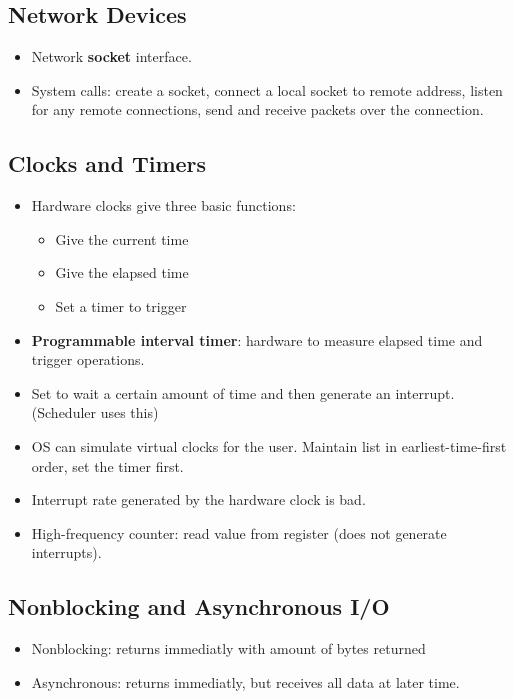 \documentclass[10pt]{report}
\begin{document}
		\subsection{Network Devices}
			\begin{itemize}
				\item Network \textbf{socket} interface.
				\item System calls: create a socket, connect a local socket to remote address, listen for any remote connections, send and receive packets over the connection.
			\end{itemize}

		\subsection{Clocks and Timers}
			\begin{itemize}
				\item Hardware clocks give three basic functions:
				\begin{itemize}
					\item Give the current time
					\item Give the elapsed time
					\item Set a timer to trigger
				\end{itemize}
				\item \textbf{Programmable interval timer}: hardware to measure elapsed time and trigger operations.
				\item Set to wait a certain amount of time and then generate an interrupt. (Scheduler uses this)
				\item OS can simulate virtual clocks for the user. Maintain list in earliest-time-first order, set the timer first.
				\item Interrupt rate generated by the hardware clock is bad.
				\item High-frequency counter: read value from register (does not generate interrupts).
			\end{itemize}

		\subsection{Nonblocking and Asynchronous I/O}
			\begin{itemize}
				\item Nonblocking: returns immediatly with amount of bytes returned
				\item Asynchronous: returns immediatly, but receives all data at later time.
			\end{itemize}
\end{document}
